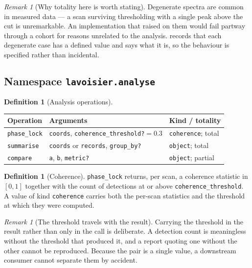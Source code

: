\documentclass[11pt,twocolumn,a4paper]{article}
\theoremstyle{ssthm}
\theoremstyle{definition}
\newtheorem{definition}[theorem]{Definition}
\theoremstyle{remark}
\newtheorem{remark}[theorem]{Remark}
\newcommand{\shk}[1]{\texttt{#1}}
\begin{document}
\begin{remark}[Why totality here is worth stating]
\label{rem:totality-why}
Degenerate spectra are common in measured data --- a scan surviving
thresholding with a single peak above the cut is unremarkable. An
implementation that raised on them would fail partway through a cohort
for reasons unrelated to the analysis.  records
that each degenerate case has a defined value and says what it is, so the
behaviour is specified rather than incidental.
\end{remark}

\subsection{Namespace \shk{lavoisier.analyse}}

\begin{definition}[Analysis operations]
\label{def:analyse-ops}
\hfill
\begin{longtable}{@{}p{}p{}p{}@{}}
\toprule
\textbf{Operation} & \textbf{Arguments} & \textbf{Kind / totality}\\
\midrule
\endhead
\shk{phase\_lock} &
\shk{coords}, \shk{coherence\_threshold?}$=0.3$ &
\shk{coherence}; total\\
\addlinespace
\shk{summarise} &
\shk{coords} or \shk{records}, \shk{group\_by?} &
\shk{object}; total\\
\addlinespace
\shk{compare} &
\shk{a}, \shk{b}, \shk{metric?} &
\shk{object}; partial\\
\bottomrule
\end{longtable}
\end{definition}

\begin{definition}[Coherence]
\label{def:coherence}
\shk{phase\_lock} returns, per scan, a coherence statistic in $[0,1]$
together with the count of detections at or above
\shk{coherence\_threshold}. A value of kind \shk{coherence} carries both
the per-scan statistics and the threshold at which they were computed.
\end{definition}

\begin{remark}[The threshold travels with the result]
\label{rem:threshold-travels}
Carrying the threshold in the result rather than only in the call is
deliberate. A detection count is meaningless without the threshold that
produced it, and a report quoting one without the other cannot be
reproduced. Because the pair is a single value, a downstream consumer
cannot separate them by accident.
\end{remark}
\end{document}
